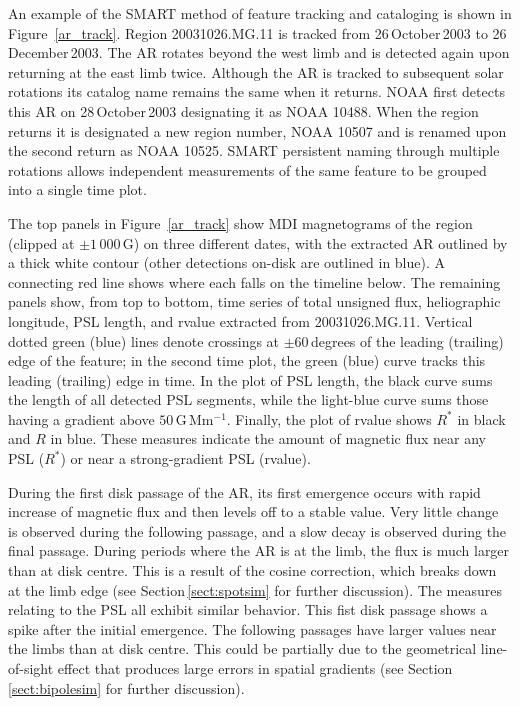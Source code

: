 An example of the \gls{SMART} method of feature tracking and cataloging is shown in Figure~\ref{ar_track}. Region 20031026.MG.11 is tracked from 26\,October\,2003 to 26\,December\,2003. The \gls{AR} rotates beyond the west limb and is detected again upon returning at the east limb twice. Although the \gls{AR} is tracked to subsequent solar rotations its catalog name remains the same when it returns. \gls{NOAA} first detects this \gls{AR} on 28\,October\,2003 designating it as \gls{NOAA} 10488. When the region returns it is designated a new region number, \gls{NOAA} 10507 and is renamed upon the second return as \gls{NOAA} 10525. \gls{SMART} persistent naming through multiple rotations allows independent measurements of the same feature to be grouped into a single time plot.

The top panels in Figure~\ref{ar_track} show \gls{MDI} magnetograms of the region (clipped at $\pm$$1\,000$\,G) on three different dates, with the extracted \gls{AR} outlined by a thick white contour (other detections on-disk are outlined in blue). A connecting red line shows where each falls on the timeline below. The remaining panels show, from top to bottom, time series of total unsigned flux, heliographic longitude, \gls{PSL} length, and \gls{rvalue} extracted from 20031026.MG.11. Vertical dotted green (blue) lines denote crossings at $\pm$$60$\,degrees of the leading (trailing) edge of the feature; in the second time plot, the green (blue) curve tracks this leading (trailing) edge in time. In the plot of \gls{PSL} length, the black curve sums the length of all detected \gls{PSL} segments, while the light-blue curve sums those having a gradient above $50$\,G\,Mm$^{-1}$. Finally, the plot of \gls{rvalue} shows $R^{*}$ in black and $R$ in blue. These measures indicate the amount of magnetic flux near any PSL ($R^{*}$) or near a strong-gradient PSL (\gls{rvalue}). 

During the first disk passage of the AR, its first emergence occurs with rapid increase of magnetic flux and then levels off to a stable value. Very little change is observed during the following passage, and a slow decay is observed during the final passage. During periods where the AR is at the limb, the flux is much larger than at disk centre. This is a result of the cosine correction, which breaks down at the limb edge (see Section\,\ref{sect:spotsim} for further discussion). The measures relating to the PSL all exhibit similar behavior. This fist disk passage shows a spike after the initial emergence. The following passages have larger values near the limbs than at disk centre. This could be partially due to the geometrical line-of-sight effect that produces large errors in spatial gradients (see Section\,\ref{sect:bipolesim} for further discussion). 

